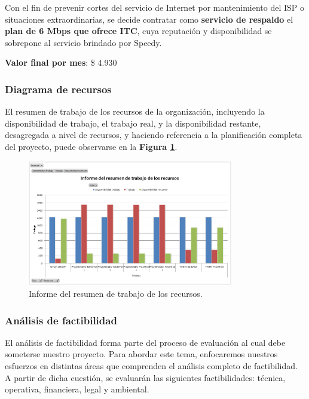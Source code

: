 Con el fin de prevenir cortes del servicio de Internet por mantenimiento del ISP o situaciones extraordinarias, se decide contratar como \textbf{servicio de respaldo} el \textbf{plan de 6 Mbps que ofrece ITC}, cuya reputación y disponibilidad se sobrepone al servicio brindado por Speedy.

\textbf{Valor final por mes}: \$ 4.930



\subsubsection{Diagrama de recursos}

El resumen de trabajo de los recursos de la organización, incluyendo la disponibilidad de trabajo, el trabajo real, y la disponibilidad restante, desagregada a nivel de recursos, y haciendo referencia a la planificación completa del proyecto, puede observarse en la \textbf{Figura \ref{resumen-trabajo-recursos}}.

\begin{figure}
    \centering
    \includegraphics[width=0.8\textwidth]{img/tp2_capitulo3/resumen-trabajo-recursos}
    \caption{Informe del resumen de trabajo de los recursos.}
    \label{resumen-trabajo-recursos}
\end{figure}

\subsubsection{Análisis de factibilidad}

El análisis de factibilidad forma parte del proceso de evaluación al cual debe someterse nuestro proyecto.
Para abordar este tema, enfocaremos nuestros esfuerzos en distintas áreas que comprenden el análisis completo de factibilidad. %
A partir de dicha cuestión, se evaluarán las siguientes factibilidades: técnica, operativa, financiera, legal y ambiental.


